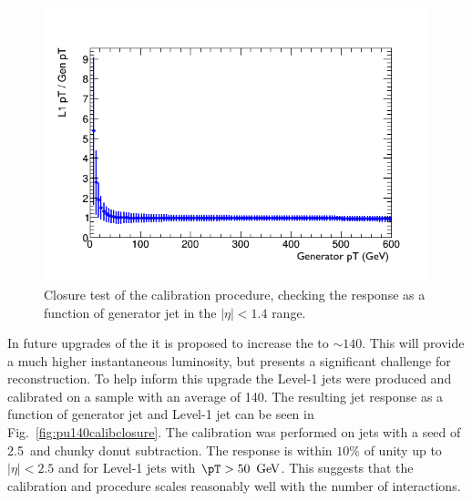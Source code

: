 \begin{figure}
	\begin{center}
		\includegraphics[width=0.8\linewidth]{figs/trigger/calibClosure_s5_donut}
  \caption{Closure test of the calibration procedure, checking the
  response as a function of generator jet \pT in the $|\eta|<1.4$ range.}
  \label{fig:calibclosure}
	\end{center}
\end{figure}

In future upgrades of the \LHC it is proposed to increase the \PU to
$\sim 140$. This will provide a much higher instantaneous luminosity,
but presents a significant challenge for reconstruction. To help
inform this upgrade the Level-1 jets were produced and calibrated on a
sample with an average \PU of 140. The resulting jet response as a
function of generator jet \pT and Level-1 jet \eta can be seen in
Fig.~\ref{fig:pu140calibclosure}. The calibration was performed on
jets with a seed of 2.5~\gev and chunky donut subtraction. The
response is within $10\%$ of unity up to $|\eta|<2.5$ and for Level-1
jets with $\pT>50~\gev$. This suggests that the calibration and \PUS
procedure scales reasonably well with the number of \PU interactions.

